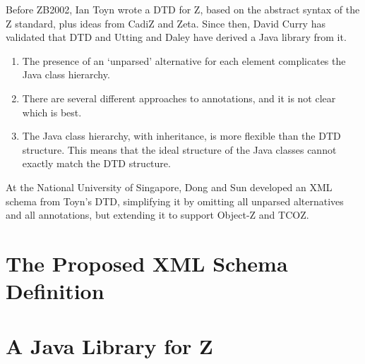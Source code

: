   Before ZB2002, Ian Toyn wrote a DTD for Z, based on the abstract
  syntax of the Z standard, plus ideas from CadiZ and Zeta.
  Since then, David Curry has validated that DTD and Utting and Daley
  have derived a Java library from it.


\begin{enumerate}
\item The presence of an `unparsed' alternative for each element
      complicates the Java class hierarchy.
\item There are several different approaches to annotations,
        and it is not clear which is best.
\item The Java class hierarchy, with inheritance, is more flexible
        than the DTD structure.  This means that the ideal structure
        of the Java classes cannot exactly match the DTD
        structure. 
\end{enumerate}

  At the National University of Singapore, Dong and Sun developed an XML
  schema from Toyn's DTD, simplifying it by omitting all unparsed
  alternatives and all annotations, but extending it to support Object-Z
  and TCOZ.   


\section{The Proposed XML Schema Definition}




\section{A Java Library for Z}


